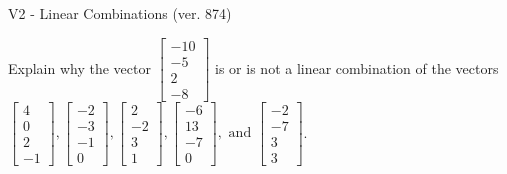 \begin{exercise}
  \begin{exerciseTitle}V2 - Linear Combinations (ver. 874)\end{exerciseTitle}
  \begin{exerciseStatement}
    Explain why the vector \(\left[\begin{array}{c}
-10 \\
-5 \\
2 \\
-8
\end{array}\right]\)  is or is not a linear 
	combination of the vectors \(\left[\begin{array}{c}
4 \\
0 \\
2 \\
-1
\end{array}\right] , \left[\begin{array}{c}
-2 \\
-3 \\
-1 \\
0
\end{array}\right] , \left[\begin{array}{c}
2 \\
-2 \\
3 \\
1
\end{array}\right] , \left[\begin{array}{c}
-6 \\
13 \\
-7 \\
0
\end{array}\right] , \text{ and } \left[\begin{array}{c}
-2 \\
-7 \\
3 \\
3
\end{array}\right]\).
	



\end{exerciseStatement}
\end{exercise}

